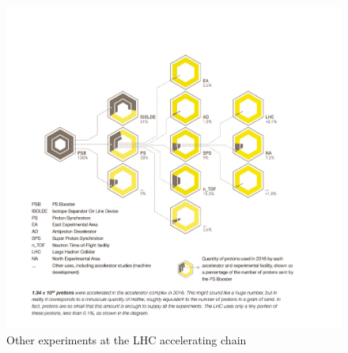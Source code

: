 \begin{figure}[!htbp]
	\centering
	\includegraphics[width=1.0\textwidth]{figures/LHC/distribution_of_protons_en.jpg}
	\caption{Other experiments at the LHC accelerating chain \cite{OtherExpAtLHCAcceleratingChain}}
	\label{fig:OtherExpAtAccStructure}
\end{figure}
